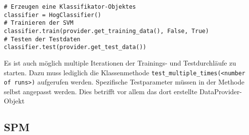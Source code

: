 \begin{verbatim}
# Erzeugen eine Klassifikator-Objektes
classifier = HogClassifier()
# Trainieren der SVM
classifier.train(provider.get_training_data(), False, True)
# Testen der Testdaten
classifier.test(provider.get_test_data())
\end{verbatim}

Es ist auch möglich multiple Iterationen der Trainings- und Testdurchläufe zu starten. Dazu muss lediglich die Klassenmethode \texttt{test\_multiple\_times(<number of runs>)} aufgerufen werden. Spezifische Testparameter müssen in der Methode selbst angepasst werden. Dies betrifft vor allem das dort erstellte DataProvider-Objekt



\subsection*{SPM}




